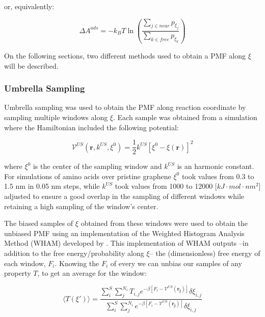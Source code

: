 \documentclass[twoside,twocolumn,9pt]{article}
\begin{document}
or, equivalently:

\begin{equation}
\label{eq:Aads-from-PMF-p}
\Delta A^{ads} = - k_B T \ln \left(\frac{\sum_{j \in near} p_{\xi_j}}{\sum_{k \in free} p_{\xi_k}}\right)
\end{equation}

On the following sections, two different methods used to obtain a PMF along $\xi$ will be described.

\subsubsection{Umbrella Sampling}

Umbrella sampling\cite{Torrie_1977} was used to obtain the PMF along
reaction coordinate by sampling multiple windows along $\xi$. Each sample
was obtained from a simulation where the Hamiltonian included the
following potential:

\begin{equation}
\label{eq:umbrella-potential}
\mathcal{V}^{US}(\mathbf{r}, k^{US}, \xi^0) = \frac{1}{2}k^{US}[\xi^0
- \xi(\mathbf{r})]^2
\end{equation}

where $\xi^0$ is the center of the sampling window and $k^{US}$ is an
harmonic constant. For simulations of amino acids over pristine
graphene $\xi^0$ took values from 0.3 to 1.5 nm in 0.05 nm steps, while $k^{US}$ took
values from 1000 to 12000 [$kJ \cdot mol \cdot nm^2$] adjusted to
ensure a good overlap in the sampling of different windows while
retaining a high sampling of the window's center.

The biased samples of $\xi$ obtained from these windows were used
to obtain the unbiased PMF using an implementation of the Weighted Histogram Analysis
Method (WHAM)\cite{Kumar_1992, Kumar_1995} developed by
\citet{WHAM}. This implementation of WHAM outputs --in addition to the
free energy/probability along $\xi$-- the (dimensionless) free energy
of each window, $F_i$. Knowing the $F_i$ of every we can unbias our
samples of any property $T$, to get an average for the window:

\begin{equation}
\label{eq:WHAM-unbias}
\langle T(\xi') \rangle = \frac{\sum_i^{S} \sum_j^{N_i} T_{i, j}
  e^{-\beta[F_i - \mathcal{V}^{US}(\mathbf{r_j})]}
  \delta \xi_{i, j}}{\sum_i^{S} \sum_j^{N_i}
  e^{-\beta[F_i - \mathcal{V}^{US}(\mathbf{r_j})]}
  \delta \xi_{i, j}}
\end{equation}
\end{document}
